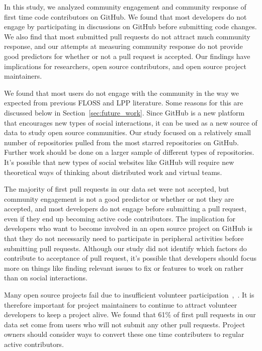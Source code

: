 \documentclass{iitthesis}
\begin{document}
 \label{chap:conclusion}

In this study, we analyzed community engagement and community response of first
time code contributors on GitHub. We found that most developers do not engage by
participating in discussions on GitHub before submitting code changes. We also
find that most submitted pull requests do not attract much community response,
and our attempts at measuring community response do not provide good predictors
for whether or not a pull request is accepted. Our findings have implications
for researchers, open source contributors, and open source project maintainers.

We found that most users do not engage with the community in the way we expected
from previous FLOSS and LPP literature. Some reasons for this are discussed
below in Section~\ref{sec:future_work}. Since GitHub is a new platform that
encourages new types of social interactions, it can be used as a new source of
data to study open source communities. Our study focused on a relatively small
number of repositories pulled from the most starred repositories on GitHub.
Further work should be done on a larger sample of different types of
repositories. It's possible that new types of social websites like GitHub will
require new theoretical ways of thinking about distributed work and virtual
teams.

The majority of first pull requests in our data set were not accepted, but
community engagement is not a good predictor or whether or not they are
accepted, and most developers do not engage before submitting a pull request,
even if they end up becoming active code contributors. The implication for
developers who want to become involved in an open source project on GitHub is
that they do not necessarily need to participate in peripheral activities before
submitting pull requests. Although our study did not identify which factors do
contribute to acceptance of pull request, it's possible that developers should
focus more on things like finding relevant issues to fix or features to work on
rather than on social interactions.

Many open source projects fail due to insufficient volunteer
participation~\cite{crowston_defining_2003},~\cite{krishnamurthy_cave_2002}. It
is therefore important for project maintainers to continue to attract volunteer
developers to keep a project alive. We found that 61\% of first pull requests
in our data set come from users who will not submit any other pull requests.
Project owners should consider ways to convert these one time contributers to
regular active contributors.
\end{document}
